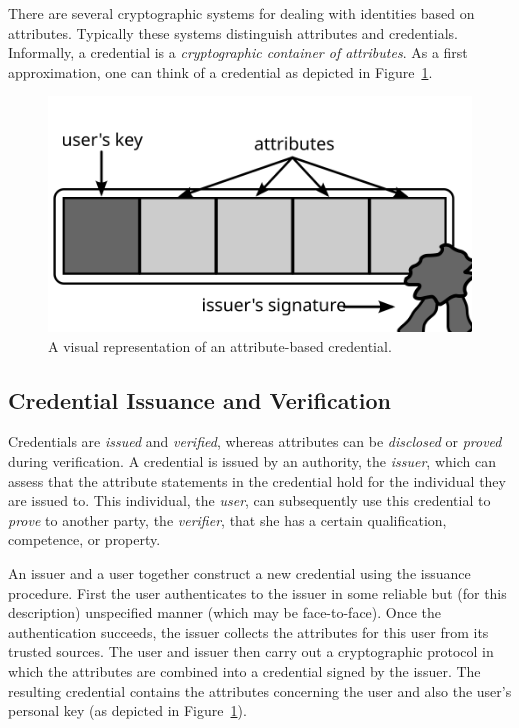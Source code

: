 There are several cryptographic systems for dealing with identities based on
attributes. Typically these systems distinguish attributes and credentials.
Informally, a credential is a \emph{cryptographic container
 of attributes}. As a first approximation, one
can think of a credential as depicted in Figure~\ref{fig:Credential}.

\begin{figure}[ht]
  \centering
  \includegraphics[scale=.5]{images/credential}
  \caption{A visual representation of an attribute-based credential.}
  \label{fig:Credential}
\end{figure}

\subsection{Credential Issuance and Verification}

Credentials are \emph{issued} and \emph{verified}, whereas attributes can be
\emph{disclosed} or \emph{proved} during verification. A credential is issued
by an authority, the \emph{issuer}, which can assess that the
attribute statements in the credential hold for the individual they are issued
to. This individual, the \emph{user}, can subsequently use this credential to
\emph{prove} to another party, the \emph{verifier}, that she
has a certain qualification, competence, or property.

An issuer and a user together construct a new credential using the issuance
procedure. First the user authenticates to the issuer
in some reliable but (for this description) unspecified manner (which may be
face-to-face). Once the authentication succeeds, the issuer collects the
attributes for this user from its trusted sources. The user and issuer then
carry out a cryptographic protocol in which the attributes are combined into a
credential signed by the issuer. The resulting credential contains the
attributes concerning the user and also the user's personal key (as depicted in
Figure~\ref{fig:Credential}).

